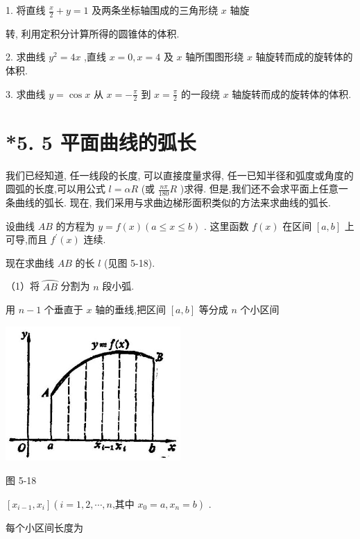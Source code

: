 \documentclass[10pt]{article}
\begin{document}
1. 将直线 \(\frac{x}{2} + y = 1\) 及两条坐标轴围成的三角形绕 \(x\) 轴旋

转, 利用定积分计算所得的圆锥体的体积.

2. 求曲线 \({y}^{2} = {4x}\) ,直线 \(x = 0,x = 4\) 及 \(x\) 轴所围图形绕 \(x\) 轴旋转而成的旋转体的体积.

3. 求曲线 \(y = \cos x\) 从 \(x = - \frac{\pi }{2}\) 到 \(x = \frac{\pi }{2}\) 的一段绕 \(x\) 轴旋转而成的旋转体的体积.

\section*{*5. 5 平面曲线的弧长}

我们已经知道, 任一线段的长度, 可以直接度量求得, 任一已知半径和弧度或角度的圆弧的长度,可以用公式 \(l = {\alpha R}\) (或 \(\frac{n\pi }{180}R\) )求得. 但是,我们还不会求平面上任意一条曲线的弧长. 现在, 我们采用与求曲边梯形面积类似的方法来求曲线的弧长.

设曲线 \({AB}\) 的方程为 \(y = f\left( x\right) \left( {a \leq x \leq b}\right)\) . 这里函数 \(f\left( x\right)\) 在区间 \(\left\lbrack {a,b}\right\rbrack\) 上可导,而且 \({f}^{\prime }\left( x\right)\) 连续.

现在求曲线 \({AB}\) 的长 \(l\) (见图 5-18).

（1）将 \(\overset{⏜}{AB}\) 分割为 \(n\) 段小弧.

用 \(n - 1\) 个垂直于 \(x\) 轴的垂线,把区间 \(\left\lbrack {a,b}\right\rbrack\) 等分成 \(n\) 个小区间

\begin{center}
\includegraphics[max width=0.5\textwidth]{images/01912c18-5c3f-733d-b775-749ba9897a9d_240_926911.jpg}
\end{center}

图 5-18

\(\left\lbrack {{x}_{i - 1},{x}_{i}}\right\rbrack \left( {i = 1,2,\cdots ,n\text{,其中 }{x}_{0} = a,{x}_{n} = b}\right)\) .

每个小区间长度为
\end{document}
